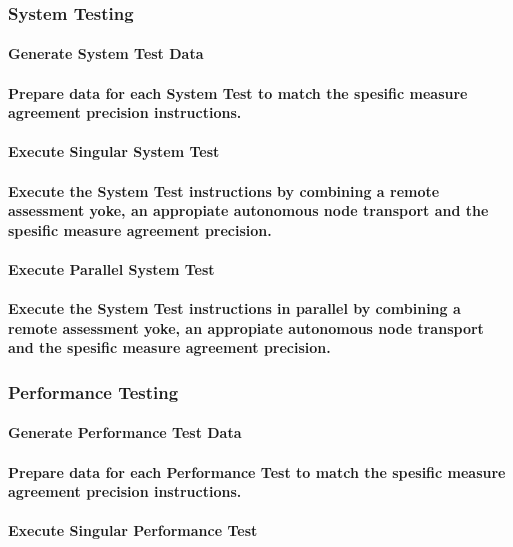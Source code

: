 \subsubsection{System Testing}
\paragraph{Generate System Test Data}
\paragraph{Prepare data for each System Test to match the spesific measure agreement precision instructions.}
\paragraph{Execute Singular System Test}
\paragraph{Execute the System Test instructions by combining a remote assessment yoke, an appropiate autonomous node transport and the spesific measure agreement precision.}
\paragraph{Execute Parallel System Test}
\paragraph{Execute the System Test instructions in parallel by combining a remote assessment yoke, an appropiate autonomous node transport and the spesific measure agreement precision.}
\subsubsection{Performance Testing}
\paragraph{Generate Performance Test Data}
\paragraph{Prepare data for each Performance Test to match the spesific measure agreement precision instructions.}
\paragraph{Execute Singular Performance Test}
